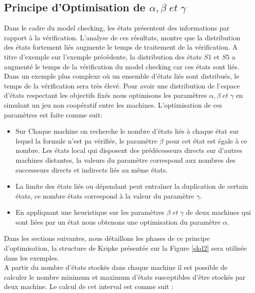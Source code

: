 
\subsection{Principe d'Optimisation de $\alpha, \beta\; et\; \gamma$}
 
Dans le cadre du model checking, les états présentent des informations par rapport à la vérification. L’analyse de ces résultats, montre que la distribution des états fortement liés augmente le temps de traitement de la vérification. A titre d'exemple sur l'exemple précédente, la distribution des états $S1$ et $S5$ a augmenté le temps de la vérification du model checking car ces états sont liés. Dans un exemple plus complexe o\`{u} un ensemble d’états liés sont distribués, le temps de la vérification sera très élevé. Pour avoir une distribution de l'espace d'états respectant les objectifs fixés nous optimisons les paramètres $\alpha, \beta \; et\; \gamma$ en simulant un jeu non coopératif entre les machines. L'optimisation de ces paramètres est faite comme suit:
\begin{itemize}
	\item Sur Chaque machine on recherche le nombre d'états liés à chaque état sur lequel la formule n'est pa vérifiée, le paramètre $\beta$ pour cet état est égale à ce nombre. Les états local qui disposent des prédécesseurs directs sur d'autres machines distantes, la valeurs du paramètre correspond aux nombres des successeurs directs et indirects liés au même états.
	\item La limite des états liés ou dépendant peut entraîner la duplication de certain états, ce nombre états correspond à la valeur du paramètre $\gamma$. 
	\item En appliquant une heuristique sur les paramètres $\beta \; et\; \gamma$ de deux machines qui sont liées par un état nous obtenons une optimisation du paramètre $\alpha$.
\end{itemize}
Dans les sections suivantes, nous détaillons les phases de ce principe d'optimisation, la structure de Kripke présentée sur la Figure \ref{skd2} sera utilisée dans les exemples. \\

A partir du nombre d'états stockés dans chaque machine il est possible de calculer le nombre minimum et maximum d’états susceptibles d’être stockés par deux machine. Le calcul de cet interval est comme suit :

